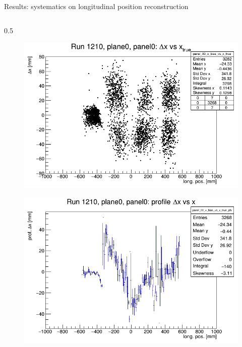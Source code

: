 \documentclass{beamer}[10pt]
\begin{document}
\begin{frame}{Results: systematics on longitudinal position reconstruction}
  \vspace{-3mm}
  \begin{columns}
    \begin{column}{0.5\framewidth}
      \begin{figure}[H]
        \centering
        \includegraphics[width= \textwidth]{figures/pdf/panel_00_x_bias_vs_x.png}
        \label{fig:enter-label}
    \end{figure}
    \vspace{-12mm}
    \begin{figure}[H]
      \centering
      \includegraphics[width= \textwidth]{figures/pdf/panel_00_x_bias_vs_x_prof.png}
      \label{fig:enter-label}
  \end{figure}
    \end{column}

\end{columns}
\end{frame}
\end{document}
